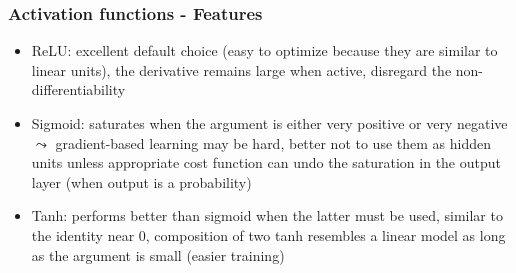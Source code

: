 \documentclass{beamer}
\begin{document}
\begin{frame}
\begin{figure}
			\qquad
		\end{figure}
	\end{frame}
	
	\begin{frame}
		\frametitle{Activation functions - Features}
		\begin{itemize}
			\item ReLU: excellent default choice (easy to optimize because they are similar to linear units), the derivative remains large when active,  disregard the non-differentiability
			\item Sigmoid: saturates when the argument is either very positive or very negative $\leadsto$ gradient-based learning may be hard, better not to use them as hidden units unless appropriate cost function can undo the saturation in the output layer (when output is a probability)
			\item Tanh: performs better than sigmoid when the latter must be used, similar to the identity near 0, composition of two tanh resembles a linear model as long as the argument is small (easier training)
		\end{itemize}
	\end{frame}
\end{document}
